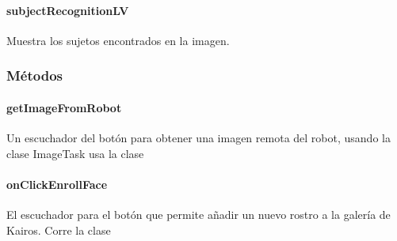 \paragraph{subjectRecognitionLV}
\label{\detokenize{dev_docs:subjectrecognitionlv}}

\begin{fulllineitems}
\label{\detokenize{dev_docs:com.lar.cloudnao.FaceRecognitionActivity.subjectRecognitionLV}}
Muestra los sujetos encontrados en la imagen.

\end{fulllineitems}



\subsubsection{Métodos}
\label{\detokenize{dev_docs:id17}}

\paragraph{getImageFromRobot}
\label{\detokenize{dev_docs:getimagefromrobot}}

\begin{fulllineitems}
\label{\detokenize{dev_docs:com.lar.cloudnao.FaceRecognitionActivity.getImageFromRobot()}}
Un escuchador del botón para obtener una imagen remota del robot, usando la clase ImageTask usa la clase 

\end{fulllineitems}



\paragraph{onClickEnrollFace}
\label{\detokenize{dev_docs:onclickenrollface}}

\begin{fulllineitems}
\label{\detokenize{dev_docs:com.lar.cloudnao.FaceRecognitionActivity.onClickEnrollFace()}}
El escuchador para el botón que permite añadir un nuevo rostro a la galería de Kairos. Corre la clase 

\end{fulllineitems}



